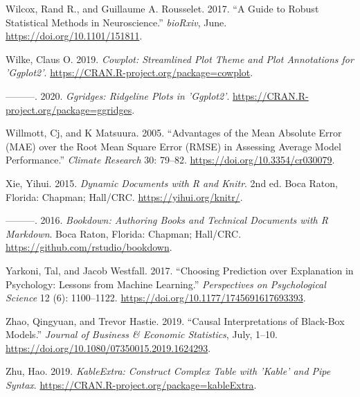 \documentclass[
]{book}
\newlength{\cslhangindent}
\newenvironment{cslreferences}%
  {\setlength{\parindent}{0pt}%
  \everypar{\setlength{\hangindent}{\cslhangindent}}\ignorespaces}%
  {\par}
\begin{document}
\begin{cslreferences}
\leavevmode\hypertarget{ref-wilcoxGuideRobustStatistical2017}{}%
Wilcox, Rand R., and Guillaume A. Rousselet. 2017. ``A Guide to Robust Statistical Methods in Neuroscience.'' \emph{bioRxiv}, June. \url{https://doi.org/10.1101/151811}.

\leavevmode\hypertarget{ref-R-cowplot}{}%
Wilke, Claus O. 2019. \emph{Cowplot: Streamlined Plot Theme and Plot Annotations for 'Ggplot2'}. \url{https://CRAN.R-project.org/package=cowplot}.

\leavevmode\hypertarget{ref-R-ggridges}{}%
---------. 2020. \emph{Ggridges: Ridgeline Plots in 'Ggplot2'}. \url{https://CRAN.R-project.org/package=ggridges}.

\leavevmode\hypertarget{ref-willmottAdvantagesMeanAbsolute2005}{}%
Willmott, Cj, and K Matsuura. 2005. ``Advantages of the Mean Absolute Error (MAE) over the Root Mean Square Error (RMSE) in Assessing Average Model Performance.'' \emph{Climate Research} 30: 79--82. \url{https://doi.org/10.3354/cr030079}.

\leavevmode\hypertarget{ref-R-knitr}{}%
Xie, Yihui. 2015. \emph{Dynamic Documents with R and Knitr}. 2nd ed. Boca Raton, Florida: Chapman; Hall/CRC. \url{https://yihui.org/knitr/}.

\leavevmode\hypertarget{ref-R-bookdown}{}%
---------. 2016. \emph{Bookdown: Authoring Books and Technical Documents with R Markdown}. Boca Raton, Florida: Chapman; Hall/CRC. \url{https://github.com/rstudio/bookdown}.

\leavevmode\hypertarget{ref-yarkoniChoosingPredictionExplanation2017}{}%
Yarkoni, Tal, and Jacob Westfall. 2017. ``Choosing Prediction over Explanation in Psychology: Lessons from Machine Learning.'' \emph{Perspectives on Psychological Science} 12 (6): 1100--1122. \url{https://doi.org/10.1177/1745691617693393}.

\leavevmode\hypertarget{ref-zhaoCausalInterpretationsBlackBox2019}{}%
Zhao, Qingyuan, and Trevor Hastie. 2019. ``Causal Interpretations of Black-Box Models.'' \emph{Journal of Business \& Economic Statistics}, July, 1--10. \url{https://doi.org/10.1080/07350015.2019.1624293}.

\leavevmode\hypertarget{ref-R-kableExtra}{}%
Zhu, Hao. 2019. \emph{KableExtra: Construct Complex Table with 'Kable' and Pipe Syntax}. \url{https://CRAN.R-project.org/package=kableExtra}.
\end{cslreferences}
\end{document}
